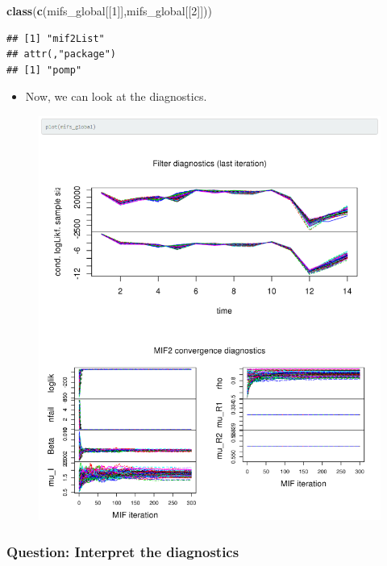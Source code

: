 \documentclass[]{article}
\newenvironment{Shaded}{\begin{snugshade}}{\end{snugshade}}
\newcommand{\KeywordTok}[1]{\textcolor[rgb]{0.13,0.29,0.53}{\textbf{#1}}}
\newcommand{\DecValTok}[1]{\textcolor[rgb]{0.00,0.00,0.81}{#1}}
\newcommand{\NormalTok}[1]{#1}
\providecommand{\tightlist}{%
  \setlength{\itemsep}{0pt}\setlength{\parskip}{0pt}}
\begin{document}
\begin{Shaded}
\begin{Highlighting}[]
\KeywordTok{class}\NormalTok{(}\KeywordTok{c}\NormalTok{(mifs_global[[}\DecValTok{1}\NormalTok{]],mifs_global[[}\DecValTok{2}\NormalTok{]]))}
\end{Highlighting}
\end{Shaded}

\begin{verbatim}
## [1] "mif2List"
## attr(,"package")
## [1] "pomp"
\end{verbatim}

\begin{itemize}
\tightlist
\item
  Now, we can look at the diagnostics.
\end{itemize}

\begin{figure}[h!]
	\centering
	\includegraphics[width=0.9\linewidth]{figure/notes12-added_plot}
\end{figure}


\subsubsection{Question: Interpret the
diagnostics}\label{question-interpret-the-diagnostics}
\end{document}

